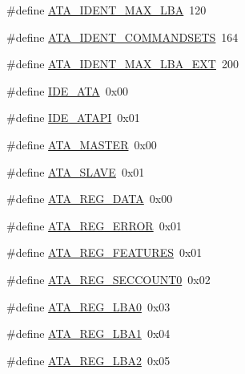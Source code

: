 \begin{DoxyCompactItemize}
\item 
\#define \hyperlink{a00005_ae0d046a29ce70e07d868961cf17b54c7_ae0d046a29ce70e07d868961cf17b54c7}{A\+T\+A\+\_\+\+I\+D\+E\+N\+T\+\_\+\+M\+A\+X\+\_\+\+L\+BA}~120
\item 
\#define \hyperlink{a00005_a8536e132f24aa36e826f753b6061e8ea_a8536e132f24aa36e826f753b6061e8ea}{A\+T\+A\+\_\+\+I\+D\+E\+N\+T\+\_\+\+C\+O\+M\+M\+A\+N\+D\+S\+E\+TS}~164
\item 
\#define \hyperlink{a00005_aa1926c13a31f512c9ec07ed3bdba8893_aa1926c13a31f512c9ec07ed3bdba8893}{A\+T\+A\+\_\+\+I\+D\+E\+N\+T\+\_\+\+M\+A\+X\+\_\+\+L\+B\+A\+\_\+\+E\+XT}~200
\item 
\#define \hyperlink{a00005_a3046279f2a25227c121b69f4cf855bf8_a3046279f2a25227c121b69f4cf855bf8}{I\+D\+E\+\_\+\+A\+TA}~0x00
\item 
\#define \hyperlink{a00005_a6513ee2a4da2c6aaa691b9d4c639a53e_a6513ee2a4da2c6aaa691b9d4c639a53e}{I\+D\+E\+\_\+\+A\+T\+A\+PI}~0x01
\item 
\#define \hyperlink{a00005_acb5691a26e836afc6972577bd71b0d97_acb5691a26e836afc6972577bd71b0d97}{A\+T\+A\+\_\+\+M\+A\+S\+T\+ER}~0x00
\item 
\#define \hyperlink{a00005_abe2ab9064f7100c5915bc694386a3e40_abe2ab9064f7100c5915bc694386a3e40}{A\+T\+A\+\_\+\+S\+L\+A\+VE}~0x01
\item 
\#define \hyperlink{a00005_a359c566cefff5e671eb3bae72e0d0948_a359c566cefff5e671eb3bae72e0d0948}{A\+T\+A\+\_\+\+R\+E\+G\+\_\+\+D\+A\+TA}~0x00
\item 
\#define \hyperlink{a00005_ad2f2744a08145beb17b7ed6ca0465d85_ad2f2744a08145beb17b7ed6ca0465d85}{A\+T\+A\+\_\+\+R\+E\+G\+\_\+\+E\+R\+R\+OR}~0x01
\item 
\#define \hyperlink{a00005_aa2dc5ed9bf4786f687e4000243f6a21d_aa2dc5ed9bf4786f687e4000243f6a21d}{A\+T\+A\+\_\+\+R\+E\+G\+\_\+\+F\+E\+A\+T\+U\+R\+ES}~0x01
\item 
\#define \hyperlink{a00005_ad995693d31857a8e514b5f96c5fc4cdb_ad995693d31857a8e514b5f96c5fc4cdb}{A\+T\+A\+\_\+\+R\+E\+G\+\_\+\+S\+E\+C\+C\+O\+U\+N\+T0}~0x02
\item 
\#define \hyperlink{a00005_a9818e533e211e2ddadf650dab77f55fd_a9818e533e211e2ddadf650dab77f55fd}{A\+T\+A\+\_\+\+R\+E\+G\+\_\+\+L\+B\+A0}~0x03
\item 
\#define \hyperlink{a00005_a4ca55ad2c56ea915f9dcde1aba57433d_a4ca55ad2c56ea915f9dcde1aba57433d}{A\+T\+A\+\_\+\+R\+E\+G\+\_\+\+L\+B\+A1}~0x04
\item 
\#define \hyperlink{a00005_afaf134917cbfc81c86b4e1d67930757a_afaf134917cbfc81c86b4e1d67930757a}{A\+T\+A\+\_\+\+R\+E\+G\+\_\+\+L\+B\+A2}~0x05

\end{DoxyCompactItemize}
